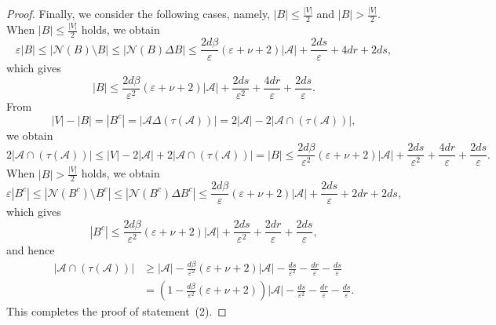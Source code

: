 \documentclass[10pt]{article}
\theoremstyle{definition}
\newcommand{\calN}{\ensuremath{\mathcal{N}}}
\newcommand{\scrA}{\ensuremath{\mathscr{A}}}
\begin{document}
\begin{proof}
Finally, we consider the following cases, namely, $|B|\leq \frac{|V|}2$ and $|B| > \frac{|V|}2$. When $|B|\leq \frac{|V|}2$ holds, we obtain 
$$
\varepsilon |B| \leq |\calN(B) \setminus B| \leq |\calN(B) \Delta B|  \leq \frac{2d \beta}\varepsilon (\varepsilon + \nu + 2)|\scrA| +  \frac {2ds}\varepsilon  + 4dr +2ds,
$$
which gives 
$$|B| \leq \frac {2d\beta}{ \varepsilon^2} ( \varepsilon + \nu + 2) |\scrA|+  \frac {2ds}{\varepsilon ^2} + \frac{4dr}\varepsilon +\frac{2ds}{\varepsilon}.
$$
From 
$$
|V| - |B| 
 = |B^c| 
  = |\scrA \Delta (\tau (\scrA))| 
 = 2|\scrA| - 2|\scrA\cap (\tau(\scrA))| ,
$$
we obtain 
$$
2|\scrA \cap (\tau(\scrA)) |
\leq |V| - 2|\scrA| + 2|\scrA \cap (\tau(\scrA))|
= |B| 
\leq \frac{2d \beta}{\varepsilon^2} (\varepsilon + \nu + 2)|\scrA|+  \frac {2ds}{\varepsilon^2} + \frac{4dr}\varepsilon +\frac{2ds}{\varepsilon}.
$$
When $|B| > \frac{|V|}2$ holds, we obtain 
$$
\varepsilon |B^c| \leq |\calN(B^c)\setminus B^c| \leq |\calN(B^c)\Delta B^c|  
\leq \frac{2d\beta}{\varepsilon}(\varepsilon + \nu + 2) |\scrA|+  \frac {2ds}\varepsilon + 2dr + 2ds ,
$$
which gives 
$$|B^c| \leq \frac{2d\beta}{\varepsilon^2}(\varepsilon + \nu + 2) |\scrA|+  \frac {2ds}{\varepsilon ^2} +\frac{2dr}{\varepsilon}
+\frac{2ds}{\varepsilon},
$$
and hence 
\begin{align*}
|\scrA \cap (\tau(\scrA)) |
&\geq |\scrA| - \frac {d\beta}{ \varepsilon^2} ( \varepsilon + \nu + 2)|\scrA| -  \frac {ds}{\varepsilon^2} -\frac{dr}{\varepsilon}
-\frac{ds}{\varepsilon}\\
&= \left( 1- \frac {d\beta}{ \varepsilon^2} ( \varepsilon + \nu + 2)\right)|\scrA| - \frac {ds}{\varepsilon^2}
-\frac{dr}{\varepsilon}
-\frac{ds}{\varepsilon} .
\end{align*}
This completes the proof of statement~(2). 
\end{proof}
\end{document}
